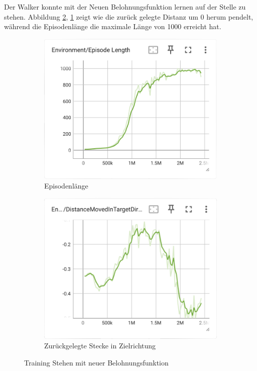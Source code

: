 Der Walker konnte mit der Neuen Belohnungsfunktion lernen auf der Stelle zu stehen.  Abbildung \ref{fig:126_move_target_dir}, \ref{fig:126_episode_length} zeigt wie die zurück gelegte Distanz um 0 herum pendelt, während die Episodenlänge die maximale Länge von 1000 erreicht hat.
\begin{figure}[H]
  \centering  
  \begin{subfigure}{.49\textwidth}
      \centering  
      \includegraphics[width=\textwidth]{img/126_episode_length}
      \caption{Episodenlänge}
      \label{fig:126_episode_length}
    \end{subfigure}
    \begin{subfigure}{.49\textwidth}
      \centering  
      \includegraphics[width=\textwidth]{img/126_move_target_dir}
      \caption{Zurückgelegte Stecke in Zielrichtung}
      \label{fig:126_move_target_dir}
    \end{subfigure}
  \caption{Training Stehen mit neuer Belohnungsfunktion}
  \label{fig:training_stehen_neu}
\end{figure}

